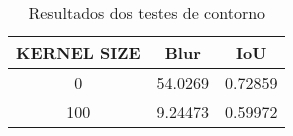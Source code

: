 \begin{table}[h]
    \centering
    \caption{Resultados dos testes de contorno}
    \label{tab:resultados_contorno}
    \begin{tabular}{|c|c|c|}
        \hline
        KERNEL SIZE & Blur & IoU \\
        \hline
        0 & 54.0269 & 0.72859\\
        100 & 9.24473 & 0.59972\\
        \hline
    \end{tabular}
\end{table}


